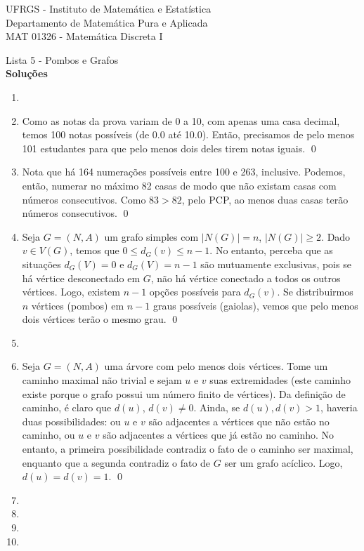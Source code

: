 \documentclass{article}
\begin{document}
\begin{flushleft}
    UFRGS - Instituto de Matemática e Estatística \\
    Departamento de Matemática Pura e Aplicada \\
    MAT 01326 - Matemática Discreta I \\
\end{flushleft}
\vspace{0.25cm}

\begin{center}
    {\LARGE Lista 5 - Pombos e Grafos} \\
    \vspace{0.4cm}
    {\large \textbf{Soluções}}

\end{center}

\begin{enumerate}
    \item [\textbf{E1}]
    \item [\textbf{E2}]
        Como as notas da prova variam de 0 a 10, com apenas uma casa decimal, temos 100 notas possíveis (de 0.0 até 10.0). Então, precisamos de pelo menos 101 estudantes para que pelo menos dois deles tirem notas iguais. \qed
    \item [\textbf{E3}]
        Nota que há 164 numerações possíveis entre 100 e 263, inclusive. Podemos, então, numerar no máximo 82 casas de modo que não existam casas com números consecutivos. Como \(83 > 82\), pelo PCP, ao menos duas casas terão números consecutivos. \qed
    \item [\textbf{E4}]
        Seja \(G = (N, A)\) um grafo simples com \(|N(G)| = n\), \(|N(G)| \geq 2\). Dado \(v \in V(G)\), temos que \(0 \leq d_G(v) \leq n-1\).
        No entanto, perceba que as situações \(d_G(V) = 0\) e \(d_G(V) = n-1\) são mutuamente exclusivas, pois se há vértice desconectado em \(G\), não há vértice conectado a todos os outros vértices. Logo, existem \(n-1\) opções possíveis para \(d_G(v)\).
        Se distribuirmos \(n\) vértices (pombos) em \(n-1\) graus possíveis (gaiolas), vemos que pelo menos dois vértices terão o mesmo grau. \qed    
    \item [\textbf{E5}]
    \item [\textbf{E6}] Seja \(G=(N,A)\) uma árvore com pelo menos dois vértices. Tome um caminho maximal não trivial e sejam \(u\) e \(v\) suas extremidades (este caminho existe porque o grafo possui um número finito de vértices). 
    Da definição de caminho, é claro que \(d(u)\), \(d(v) \neq 0\). Ainda, se \(d(u), d(v) > 1\), haveria duas possibilidades: ou \(u\) e \(v\) são adjacentes a vértices que não estão no caminho, ou \(u\) e \(v\) são adjacentes a vértices que já estão no caminho.
    No entanto, a primeira possibilidade contradiz o fato de o caminho ser maximal, enquanto que a segunda contradiz o fato de \(G\) ser um grafo acíclico. Logo, \(d(u)=d(v)=1\). \qed
    \item [\textbf{E7}]
    \item [\textbf{E8}]
    \item [\textbf{E9}]
    \item [\textbf{E10}]
\end{enumerate}
\end{document}
